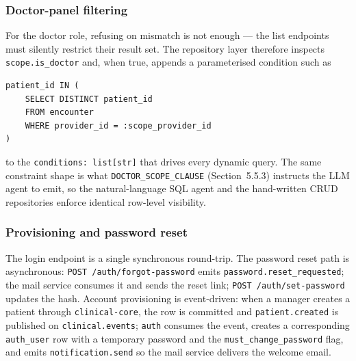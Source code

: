 \subsubsection*{Doctor-panel filtering}

For the doctor role, refusing on mismatch is not enough --- the list endpoints must silently restrict their result set. The repository layer therefore inspects \texttt{scope.is\_doctor} and, when true, appends a parameterised condition such as
\begin{verbatim}
patient_id IN (
    SELECT DISTINCT patient_id
    FROM encounter
    WHERE provider_id = :scope_provider_id
)
\end{verbatim}
to the \texttt{conditions: list[str]} that drives every dynamic query. The same constraint shape is what \texttt{DOCTOR\_SCOPE\_CLAUSE} (Section~5.5.3) instructs the LLM agent to emit, so the natural-language SQL agent and the hand-written CRUD repositories enforce identical row-level visibility.

\subsubsection*{Provisioning and password reset}

The login endpoint is a single synchronous round-trip. The password reset path is asynchronous: \texttt{POST /auth/forgot-password} emits \texttt{password.reset\_requested}; the mail service consumes it and sends the reset link; \texttt{POST /auth/set-password} updates the hash. Account provisioning is event-driven: when a manager creates a patient through \texttt{clinical-core}, the row is committed and \texttt{patient.created} is published on \texttt{clinical.events}; \texttt{auth} consumes the event, creates a corresponding \texttt{auth\_user} row with a temporary password and the \texttt{must\_change\_password} flag, and emits \texttt{notification.send} so the mail service delivers the welcome email.
